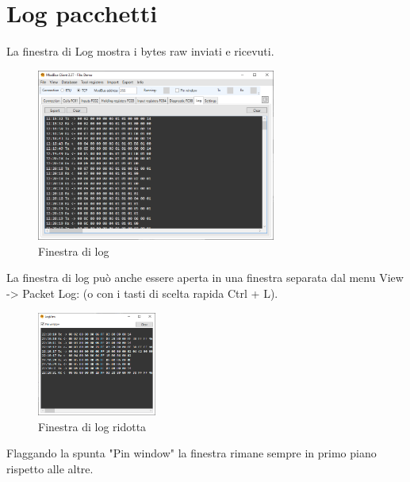 
\chapter{Log pacchetti}

La finestra di Log mostra i bytes raw inviati e ricevuti.

\begin{figure}[H]
\centering
\includegraphics[width=0.70\textwidth]{../Img/ModBus_Client_Log_00.PNG}
\caption{Finestra di log}
\end{figure}

La finestra di log può anche essere aperta in una finestra separata dal menu View -> Packet Log:
(o con i tasti di scelta rapida Ctrl + L).

\begin{figure}[H]
\centering
\includegraphics[width=0.35\textwidth]{../Img/ModBus_Client_Log_01.PNG}
\caption{Finestra di log ridotta}
\end{figure}

Flaggando la spunta "Pin window" la finestra rimane sempre in primo piano rispetto alle altre.